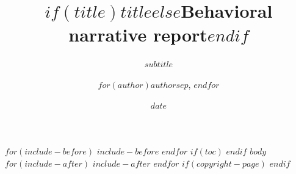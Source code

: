 \documentclass[$for(classoption)$$classoption$$sep$,$endfor$]{neudata}
\title{$if(title)$$title$$else$Behavioral narrative report$endif$}
\subtitle{$subtitle$}
\author{$for(author)$$author$$sep$, $endfor$}
\affiliation{$affiliation$}
\date{$date$}
\begin{document}
\maketitle
$for(include-before)$
$include-before$
$endfor$
$if(toc)$
\setcounter{tocdepth}{$if(toc-depth)$$toc-depth$$else$2$endif$}
\tableofcontents
\clearpage
$endif$
$body$
$for(include-after)$
$include-after$
$endfor$
$if(copyright-page)$
\neudatacopyrightpage
$endif$
\end{document}
